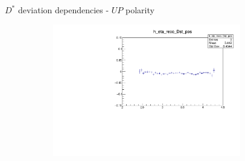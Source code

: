 \documentclass[11pt]{beamer}
\begin{document}
\begin{frame}{$D^*$ deviation dependencies - $UP$ polarity}
\begin{figure}
\begin{subfigure}{0.45\textwidth}
\end{subfigure}
\begin{subfigure}{0.45\textwidth}
\includegraphics[width=0.9\textwidth]{up_pdf/deviation/h_eta_reco_Dst_pos.pdf}
\end{subfigure}
\end{figure}
\end{frame}
\end{document}
